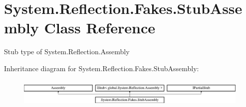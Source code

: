 \hypertarget{class_system_1_1_reflection_1_1_fakes_1_1_stub_assembly}{\section{System.\-Reflection.\-Fakes.\-Stub\-Assembly Class Reference}
\label{class_system_1_1_reflection_1_1_fakes_1_1_stub_assembly}
}


Stub type of System.\-Reflection.\-Assembly 


Inheritance diagram for System.\-Reflection.\-Fakes.\-Stub\-Assembly\-:\begin{figure}[H]
\begin{center}
\leavevmode
\includegraphics[height=1.393035cm]{class_system_1_1_reflection_1_1_fakes_1_1_stub_assembly}
\end{center}
\end{figure}
